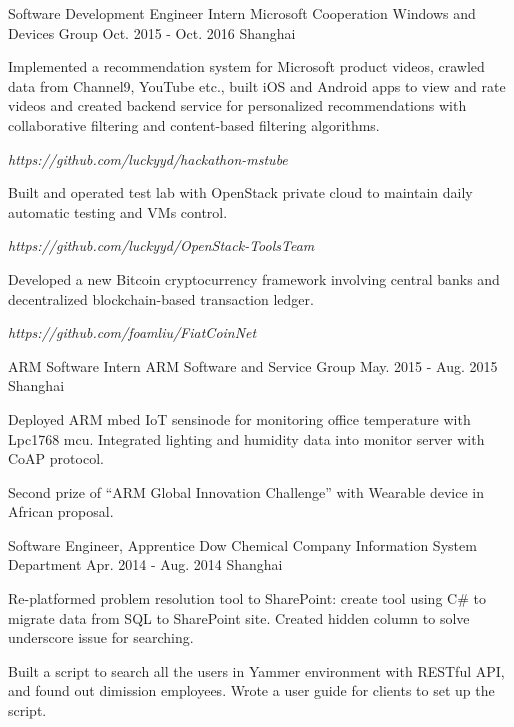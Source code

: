 \begin{cventries}
  \cventry
    {Software Development Engineer Intern}
    {Microsoft Cooperation \quad Windows and Devices Group}
    {Oct. 2015 - Oct. 2016}
    {Shanghai}
    {
      \begin{cvitems}
        \item {Implemented a recommendation system for Microsoft product videos, crawled data from Channel9, YouTube etc., built iOS and Android apps to view and rate videos and created backend service for personalized recommendations with collaborative filtering and content-based filtering algorithms.}
        \item {\color{red} \emph {https://github.com/luckyyd/hackathon-mstube}}
        \item {Built and operated test lab with OpenStack private cloud to maintain daily automatic testing and VMs control.}
        \item {\color{red} \emph {https://github.com/luckyyd/OpenStack-ToolsTeam}}
        \item {Developed a new Bitcoin cryptocurrency framework involving central banks and decentralized blockchain-based transaction ledger.}
        \item {\color{red} \emph {https://github.com/foamliu/FiatCoinNet}}
      \end{cvitems}
    }
  \cventry
    {ARM Software Intern}
    {ARM \quad Software and Service Group}
    {May. 2015 - Aug. 2015}
    {Shanghai}
    {
      \begin{cvitems}
        \item {Deployed ARM mbed IoT sensinode for monitoring office temperature with Lpc1768 mcu. Integrated lighting and humidity data into monitor server with CoAP protocol.}
        \item {Second prize of “ARM Global Innovation Challenge” with Wearable device in African proposal.}
      \end{cvitems}
    }
  \cventry
    {Software Engineer, Apprentice}
    {Dow Chemical Company \quad Information System Department}
    {Apr. 2014 - Aug. 2014}
    {Shanghai}
    {
      \begin{cvitems}
        \item {Re-platformed problem resolution tool to SharePoint: create tool using C\# to migrate data from SQL to SharePoint site. Created hidden column to solve underscore issue for searching.}
        \item {Built a script to search all the users in Yammer environment with RESTful API, and found out dimission employees. Wrote a user guide for clients to set up the script.}
      \end{cvitems} 
    }
\end{cventries}
